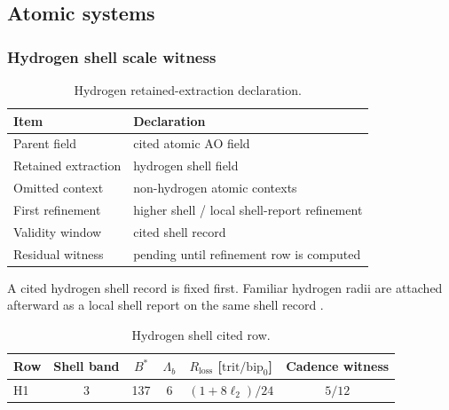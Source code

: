 \subsection{Atomic systems}

\subsubsection{Hydrogen shell scale witness}
\label{man:hydrogen-shell-scale-witness}

\begin{table}[H]
\centering
\caption{Hydrogen retained-extraction declaration.}
\label{tab:hydrogen-retention}
\begin{threeparttable}
\begin{tabularx}{\linewidth}{@{}lX@{}}
\toprule
Item & Declaration \\
\midrule
Parent field & cited atomic AO field \\
Retained extraction & hydrogen shell field \\
Omitted context & non-hydrogen atomic contexts \\
First refinement & higher shell / local shell-report refinement \\
Validity window & cited shell record \\
Residual witness & pending until refinement row is computed \\
\bottomrule
\end{tabularx}
\end{threeparttable}
\end{table}

A cited hydrogen shell record is fixed first. Familiar hydrogen radii are attached afterward as a local shell report on the same shell record \cite{aod43_main_2026}.

\begin{table}[H]
\centering
\caption{Hydrogen shell cited row.}
\label{tab:hydrogen-shell-row}
\begin{threeparttable}
\small
\begin{tabularx}{\linewidth}{@{}lccccc@{}}
\toprule
Row & Shell band & $B^*$ & $\Lambda_b$ & $R_{\mathrm{loss}}$ [\(\mathrm{trit}/\mathrm{bip}_0\)] & Cadence witness \\
\midrule
H1 & 3 & 137 & 6 & $(1+8\ell_2)/24$ & $5/12$ \\
\bottomrule
\end{tabularx}
\end{threeparttable}
\end{table}

